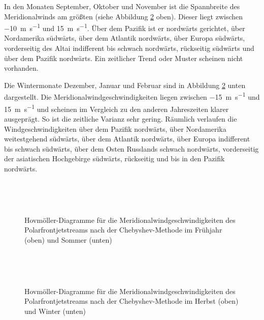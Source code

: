 In den Monaten September, Oktober und November ist die Spannbreite des Meridionalwinds am größten (siehe Abbildung \ref{fig:hovm-pfj-v-cold} oben). Dieser liegt zwischen \SI{-10}{\metre\per\second} und \SI{15}{\metre\per\second}. Über dem Pazifik ist er nordwärts gerichtet, über Nordamerika südwärts, über dem Atlantik nordwärts, über Europa südwärts, vorderseitig des Altai indifferent bis schwach nordwärts, rückseitig südwärts und über dem Pazifik nordwärts. Ein zeitlicher Trend oder Muster scheinen nicht vorhanden.

Die Wintermonate Dezember, Januar und Februar sind in Abbildung \ref{fig:hovm-pfj-v-cold} unten dargestellt. Die Meridionalwindgeschwindigkeiten liegen zwischen \SI{-15}{\metre\per\second} und \SI{15}{\metre\per\second} und scheinen im Vergleich zu den anderen Jahreszeiten klarer ausgeprägt. So ist die zeitliche Varianz sehr gering. Räumlich verlaufen die Windgeschwindigkeiten über dem Pazifik nordwärts, über Nordamerika weitestgehend südwärts, über dem Atlantik nordwärts, über Europa indifferent bis schwach südwärts, über dem Osten Russlands schwach nordwärts, vorderseitig der asiatischen Hochgebirge südwärts, rückseitig und bis in den Pazifik nordwärts.


\begin{figure} %
  \centering
  \begin{minipage}{\textwidth}
    \centering
  \end{minipage} \\ 
    \begin{minipage}{\textwidth}
      \centering
  \end{minipage} \\ 
  \caption[Hovmöllerdiagramme des Meridionalwinds des Polarfrontjets nach Chebyshev im Frühjahr und Sommer]{Hovmöller-Diagramme für die Meridionalwindgeschwindigkeiten des Polarfrontjetstreams nach der Chebyshev-Methode im Frühjahr (oben) und Sommer (unten)} \label{fig:hovm-pfj-v-warm}
\end{figure}

\begin{figure}
  \centering
  \begin{minipage}{\textwidth}
    \centering
  \end{minipage} \\ 
    \begin{minipage}{\textwidth}
      \centering
  \end{minipage} \\ 
  \caption[Hovmöllerdiagramme des Meridionalwinds des Polarfrontjets nach Chebyshev im Herbst und Winter]{Hovmöller-Diagramme für die Meridionalwindgeschwindigkeiten des Polarfrontjetstreams nach der Chebyshev-Methode im Herbst (oben) und Winter (unten)} \label{fig:hovm-pfj-v-cold}
\end{figure}
